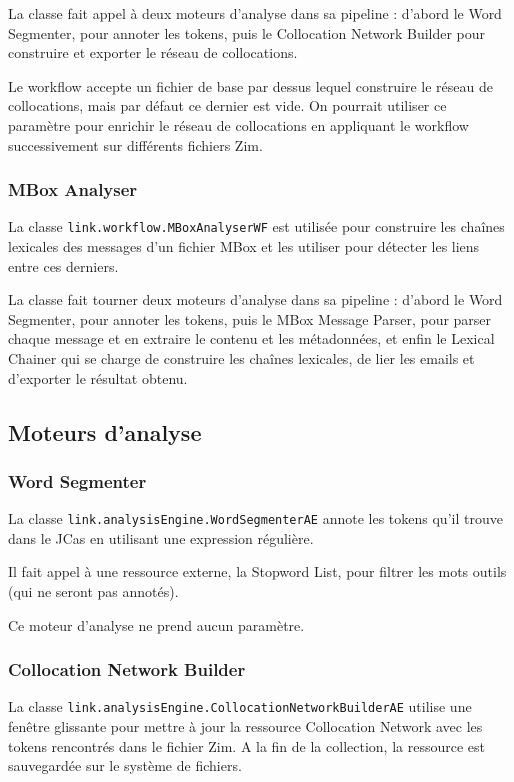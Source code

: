 \documentclass[a4paper]{article}
\begin{document}
La classe fait appel à deux moteurs d'analyse dans sa pipeline : d'abord le Word Segmenter, pour annoter les tokens, puis le Collocation Network Builder pour construire et exporter le réseau de collocations.

Le workflow accepte un fichier de base par dessus lequel construire le réseau de collocations, mais par défaut ce dernier est vide. On pourrait utiliser ce paramètre pour enrichir le réseau de collocations en appliquant le workflow successivement sur différents fichiers Zim.

\subsubsection{MBox Analyser}

La classe \texttt{link.workflow.MBoxAnalyserWF} est utilisée pour construire les chaînes lexicales des messages d'un fichier MBox et les utiliser pour détecter les liens entre ces derniers.

La classe fait tourner deux moteurs d'analyse dans sa pipeline : d'abord le Word Segmenter, pour annoter les tokens, puis le MBox Message Parser, pour parser chaque message et en extraire le contenu et les métadonnées, et enfin le Lexical Chainer qui se charge de construire les chaînes lexicales, de lier les emails et d'exporter le résultat obtenu.

\subsection{Moteurs d'analyse}

\subsubsection{Word Segmenter}
	
La classe \texttt{link.analysisEngine.WordSegmenterAE} annote les tokens qu'il trouve dans le JCas en utilisant une expression régulière.

Il fait appel à une ressource externe, la Stopword List, pour filtrer les mots outils (qui ne seront pas annotés).

Ce moteur d'analyse ne prend aucun paramètre.

\subsubsection{Collocation Network Builder}

La classe \texttt{link.analysisEngine.CollocationNetworkBuilderAE} utilise une fenêtre glissante pour mettre à jour la ressource Collocation Network avec les tokens rencontrés dans le fichier Zim. A la fin de la collection, la ressource est sauvegardée sur le système de fichiers.
\end{document}
